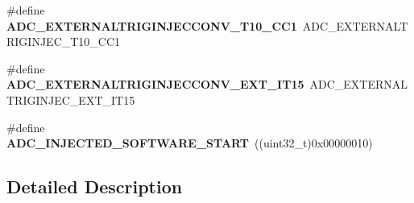 \begin{DoxyCompactItemize}
\item 
\hypertarget{group___a_d_c_ex___external__trigger__source___injected_ga68b4e68f0808913d9a47c8e4bd3c5c18}{\#define {\bfseries A\-D\-C\-\_\-\-E\-X\-T\-E\-R\-N\-A\-L\-T\-R\-I\-G\-I\-N\-J\-E\-C\-C\-O\-N\-V\-\_\-\-T10\-\_\-\-C\-C1}~A\-D\-C\-\_\-\-E\-X\-T\-E\-R\-N\-A\-L\-T\-R\-I\-G\-I\-N\-J\-E\-C\-\_\-\-T10\-\_\-\-C\-C1}\label{group___a_d_c_ex___external__trigger__source___injected_ga68b4e68f0808913d9a47c8e4bd3c5c18}

\item 
\hypertarget{group___a_d_c_ex___external__trigger__source___injected_ga364de9670181999642dcd159f22815c8}{\#define {\bfseries A\-D\-C\-\_\-\-E\-X\-T\-E\-R\-N\-A\-L\-T\-R\-I\-G\-I\-N\-J\-E\-C\-C\-O\-N\-V\-\_\-\-E\-X\-T\-\_\-\-I\-T15}~A\-D\-C\-\_\-\-E\-X\-T\-E\-R\-N\-A\-L\-T\-R\-I\-G\-I\-N\-J\-E\-C\-\_\-\-E\-X\-T\-\_\-\-I\-T15}\label{group___a_d_c_ex___external__trigger__source___injected_ga364de9670181999642dcd159f22815c8}

\item 
\hypertarget{group___a_d_c_ex___external__trigger__source___injected_gae90a9b5e1ae0cb2ef2c711d90b0b382b}{\#define {\bfseries A\-D\-C\-\_\-\-I\-N\-J\-E\-C\-T\-E\-D\-\_\-\-S\-O\-F\-T\-W\-A\-R\-E\-\_\-\-S\-T\-A\-R\-T}~((uint32\-\_\-t)0x00000010)}\label{group___a_d_c_ex___external__trigger__source___injected_gae90a9b5e1ae0cb2ef2c711d90b0b382b}

\end{DoxyCompactItemize}


\subsection{Detailed Description}
